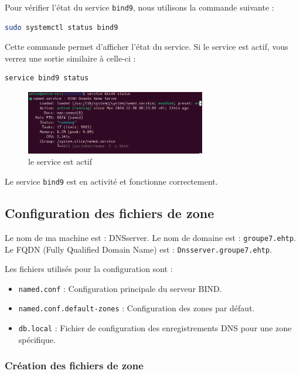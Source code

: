 	Pour vérifier l'état du service \texttt{bind9}, nous utilisons la commande suivante :
	
	\begin{lstlisting}[language=bash]
	sudo systemctl status bind9
	\end{lstlisting}
	
	Cette commande permet d’afficher l’état du service. Si le service est actif, vous verrez une sortie similaire à celle-ci :
	
	\begin{lstlisting}[language=bash]
	service bind9 status
	\end{lstlisting}
	
	\begin{figure}[h]
		\centering
		\includegraphics[width=0.7\textwidth]{DNS/status_bind9.png}
		\caption{le service est actif}
		\label{fig:ridal}
	\end{figure}

	Le service \texttt{bind9} est en activité et fonctionne correctement.

	\subsection*{Configuration des fichiers de zone}
	
	Le nom de ma machine est : DNSserver. Le nom de domaine est : \texttt{groupe7.ehtp}. Le FQDN (Fully Qualified Domain Name) est : \texttt{Dnsserver.groupe7.ehtp}.

	Les fichiers utilisés pour la configuration sont :
	\begin{itemize}
		\item \texttt{named.conf} : Configuration principale du serveur BIND.
		\item \texttt{named.conf.default-zones} : Configuration des zones par défaut.
		\item \texttt{db.local} : Fichier de configuration des enregistrements DNS pour une zone spécifique.
	\end{itemize}
	
	\subsubsection*{Création des fichiers de zone}
	
